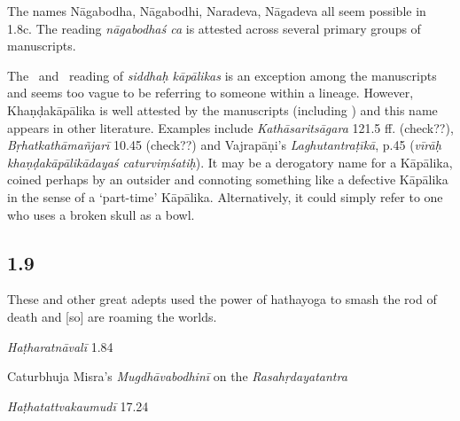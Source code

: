 \begin{ekdosis}
\begin{philcomm}[hp01_008]
The names Nāgabodha, Nāgabodhi, Naradeva, Nāgadeva all seem possible in 1.8c. The reading \emph{nāgabodhaś ca} is attested across several primary groups of manuscripts.

The \alphaOne\ and \alphaTwo\ reading of \emph{siddhaḥ kāpālikas} is an exception among the manuscripts and seems too vague to be referring to someone within a lineage. However, Khaṇḍa\-kāpālika is well attested by the manuscripts (including \alphaThree) and this name appears in other literature. Examples include \emph{Kathāsaritsāgara} 121.5 ff. (check??), \emph{Bṛhatkathāmañjarī} 10.45 (check??) and Vajrapāṇi’s \emph{Laghutantraṭīkā}, p.45 (\emph{vīrāḥ khaṇḍakāpālikādayaś caturviṃśatiḥ}). It may be a derogatory name for a Kāpālika, coined perhaps by an outsider and connoting something like a defective Kāpālika in the sense of a ‘part-time’ Kāpālika. Alternatively, it could simply refer to one who uses a broken skull as a bowl.
\end{philcomm}

\subsection*{1.9}
\begin{translation}[hp01_009]
These and other great adepts used the power of hathayoga to smash the rod of death and [so] are roaming the worlds.
\end{translation}

\begin{testimonia}[hp01_009]
\emph{Haṭharatnāvalī} 1.84

\begin{versinnote}
\end{versinnote}

Caturbhuja Misra's \emph{Mugdhāvabodhinī} on the \emph{Rasahṛdayatantra}

\begin{versinnote}
\end{versinnote}

\emph{Haṭhatattvakaumudī} 17.24

\begin{versinnote}
\end{versinnote}


\end{testimonia}
\end{ekdosis}
